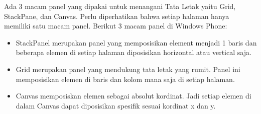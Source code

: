 \hspace{0.5cm} Ada 3 macam panel yang dipakai untuk menangani Tata Letak yaitu Grid, StackPane, dan Canvas. Perlu diperhatikan bahwa setiap halaman hanya memiliki satu macam panel. Berikut 3 macam panel di Windows Phone:

\begin{itemize}
	\item StackPanel merupakan panel yang memposisikan element menjadi 1 baris dan beberapa elemen di setiap halaman diposisikan horizontal atau vertical saja.
	\item Grid merupakan panel yang mendukung tata letak yang rumit. Panel ini memposisikan elemen di baris dan kolom mana saja di setiap halaman.
	\item Canvas memposiskan elemen sebagai absolut kordinat. Jadi setiap elemen di dalam Canvas dapat diposisikan spesifik sesuai kordinat x dan y.
\end{itemize}
	
